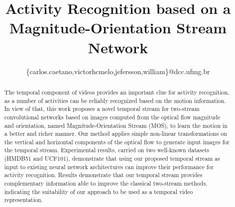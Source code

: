\documentclass[10pt,conference]{IEEEtran}
\begin{document}
\title{Activity Recognition based on a Magnitude-Orientation Stream Network}
\newif\iffinal
\finaltrue
\newcommand{\jemsid}{92}
\newcommand{\todo}[1]{{\color{red}[\textbf{TODO: }#1]}}
\newcommand{\alterar}[1]{{\color{red}[\textbf{}#1]}}
\newcommand{\verify}{{\color{red} \textbf{[*verify*] }}}
\newcommand{\verified}{{\color{blue} \textbf{[*verified - ok*] }}}
\newcommand{\changed}[1]{{\color{blue}[\textbf{changed: }#1]}}


\iffinal



\author{
	\{carlos.caetano,victorhcmelo,jefersson,william\}@dcc.ufmg.br
}

\else
  \author{Sibgrapi paper ID: \jemsid \\ }
\fi


\maketitle

\begin{abstract}
	The temporal component of videos provides an important clue for activity recognition, as a number of activities can be reliably recognized based on the motion information. In view of that, this work proposes a novel temporal stream for two-stream convolutional networks based on images computed from the optical flow magnitude and orientation, named Magnitude-Orientation Stream (MOS), to learn the motion in a better and richer manner. Our method applies simple non-linear transformations on the vertical and horizontal components of the optical flow to generate input images for the temporal stream. %
	Experimental results, carried on two well-known datasets (HMDB51 and UCF101), demonstrate that using our proposed temporal stream as input to existing neural network architectures can improve their performance for activity recognition.
	Results demonstrate that our temporal stream provides complementary information able to improve the classical two-stream methods, indicating the suitability of our approach to be used as a temporal video representation.
\end{abstract}
\end{document}
